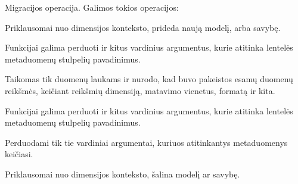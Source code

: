 \documentclass[letterpaper,10pt,lithuanian]{sphinxmanual}
\begin{document}
\begin{fulllineitems}
\label{\detokenize{dimensijos:migrate.prepare}}
\pysigstartsignatures
{}
\pysigstopsignatures
\sphinxAtStartPar
Migracijos operacija. Galimos tokios operacijos:

\begin{fulllineitems}
\label{\detokenize{dimensijos:migrate.create}}
\pysigstartsignatures
{}
\pysigstopsignatures
\sphinxAtStartPar
Priklausomai nuo dimensijos konteksto, prideda naują modelį, arba
savybę.

\sphinxAtStartPar
Funkcijai galima perduoti  ir kitus vardinius argumentus,
kurie atitinka {\hyperref[\detokenize{savokos:term-DSA}]{}} lentelės metaduomenų stulpelių
pavadinimus.

\end{fulllineitems}


\begin{fulllineitems}
\label{\detokenize{dimensijos:migrate.update}}
\pysigstartsignatures
{}
\pysigstopsignatures
\sphinxAtStartPar
Taikomas tik duomenų laukams ir nurodo, kad buvo pakeistos esamų
duomenų reikšmės, keičiant reikšmių dimensiją, matavimo vienetus,
formatą ir kita.

\sphinxAtStartPar
Funkcijai galima perduoti  ir kitus vardinius argumentus,
kurie atitinka {\hyperref[\detokenize{savokos:term-DSA}]{}} lentelės metaduomenų stulpelių
pavadinimus.

\sphinxAtStartPar
Perduodami tik tie vardiniai argumentai, kuriuos atitinkantys
metaduomenys keičiasi.

\end{fulllineitems}


\begin{fulllineitems}
\label{\detokenize{dimensijos:migrate.delete}}
\pysigstartsignatures
{}
\pysigstopsignatures
\sphinxAtStartPar
Priklausomai nuo dimensijos konteksto, šalina modelį ar savybę.


\end{fulllineitems}
\end{fulllineitems}
\end{document}
